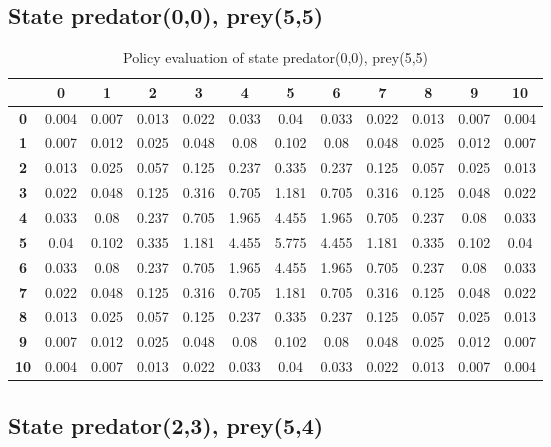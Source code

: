\documentclass[11pt]{article}
\begin{document}
\subsection{State predator(0,0), prey(5,5)}

\begin{center}
\begin{table*}[ht]
{\small
\hfill{}
\begin{tabular}{c|c|c|c|c|c|c|c|c|c|c|c}
\textbf{} & \textbf{0} & \textbf{1} & \textbf{2} & \textbf{3} & \textbf{4} & \textbf{5} & \textbf{6} & \textbf{7} & \textbf{8} & \textbf{9} & \textbf{10}\\
	\hline
	\textbf{0} 		& 0.004	& 0.007 & 0.013	& 0.022 & 0.033 & 0.04 & 0.033 & 0.022 & 0.013 & 0.007 & 0.004\\
	\textbf{1} 		& 0.007 & 0.012 & 0.025 & 0.048 & 0.08 & 0.102 & 0.08 & 0.048 & 0.025 & 0.012 & 0.007\\
\textbf{2} & 0.013	& 0.025	& 0.057	& 0.125	& 0.237	& 0.335	& 0.237	& 0.125	& 0.057	& 0.025	& 0.013	\\
\textbf{3} & 0.022	& 0.048	& 0.125	& 0.316	& 0.705	& 1.181	& 0.705	& 0.316	& 0.125	& 0.048	& 0.022	\\
\textbf{4} & 0.033	& 0.08	& 0.237	& 0.705	& 1.965	& 4.455	& 1.965	& 0.705	& 0.237	& 0.08	& 0.033	\\
\textbf{5} & 0.04	& 0.102	& 0.335	& 1.181	& 4.455	& 5.775	& 4.455	& 1.181	& 0.335	& 0.102	& 0.04	\\
\textbf{6} & 0.033	& 0.08	& 0.237	& 0.705	& 1.965	& 4.455	& 1.965	& 0.705	& 0.237	& 0.08	& 0.033	\\
\textbf{7} & 0.022	& 0.048	& 0.125	& 0.316	& 0.705	& 1.181	& 0.705	& 0.316	& 0.125	& 0.048	& 0.022	\\
\textbf{8} & 0.013	& 0.025	& 0.057	& 0.125	& 0.237	& 0.335	& 0.237	& 0.125	& 0.057	& 0.025	& 0.013	\\
\textbf{9} & 0.007	& 0.012	& 0.025	& 0.048	& 0.08	& 0.102	& 0.08	& 0.048	& 0.025	& 0.012	& 0.007	\\
\textbf{10} & 0.004	& 0.007	& 0.013	& 0.022	& 0.033	& 0.04	& 0.033	& 0.022	& 0.013	& 0.007	& 0.004	\\	
\end{tabular}}
\hfill{}
\caption{Policy evaluation of state predator(0,0), prey(5,5)}
\label{state1}
\end{table*}
\end{center}

\subsection{State predator(2,3), prey(5,4)}
\end{document}
